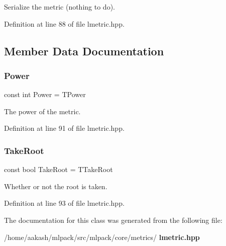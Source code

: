 Serialize the metric (nothing to do). 



Definition at line 88 of file lmetric.\+hpp.



\subsection{Member Data Documentation}
\mbox{\label{classmlpack_1_1metric_1_1LMetric_add828b673634e896b13f47cc7fb331f5}} 
\subsubsection{Power}
{\footnotesize\ttfamily const int Power = T\+Power\hspace{0.3cm}{\ttfamily [static]}}



The power of the metric. 



Definition at line 91 of file lmetric.\+hpp.

\mbox{\label{classmlpack_1_1metric_1_1LMetric_a0615e7186f9a9847e2f71d2d2622579d}} 
\subsubsection{Take\+Root}
{\footnotesize\ttfamily const bool Take\+Root = T\+Take\+Root\hspace{0.3cm}{\ttfamily [static]}}



Whether or not the root is taken. 



Definition at line 93 of file lmetric.\+hpp.



The documentation for this class was generated from the following file\+:\begin{DoxyCompactItemize}
\item 
/home/aakash/mlpack/src/mlpack/core/metrics/\textbf{ lmetric.\+hpp}\end{DoxyCompactItemize}
